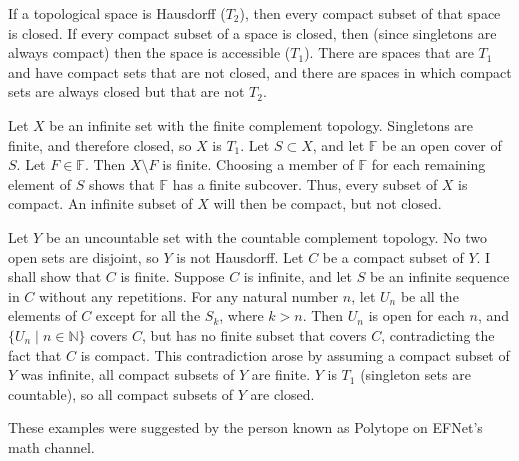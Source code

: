 \documentclass[12pt]{article}
\begin{document}
If a topological space is Hausdorff ($T_2$), then every compact subset of that space is closed.  If every compact subset of a space is closed, then (since singletons are always compact) then the space is accessible ($T_1$).  There are spaces that are $T_1$ and have compact sets that are not closed, and there are spaces in which compact sets are always closed but that are not $T_2$.

Let $X$ be an infinite set with the finite complement topology.  Singletons are finite, and therefore closed, so $X$ is $T_1$.  Let $S \subset X$, and let $\mathbb{F}$ be an open cover of $S$.  Let $F \in \mathbb{F}$.  Then $X\setminus F$ is finite.  Choosing a member of $\mathbb{F}$ for each remaining element of $S$ shows that $\mathbb{F}$ has a finite subcover.  Thus, every subset of $X$ is compact.  An infinite subset of $X$ will then be compact, but not closed.

Let $Y$ be an uncountable set with the countable complement topology.  No two open sets are disjoint, so $Y$ is not Hausdorff.  Let $C$ be a compact subset of $Y$.  I shall show that $C$ is finite.  Suppose $C$ is infinite, and let $S$ be an infinite sequence in $C$ without any repetitions.  For any natural number $n$, let $U_n$ be all the elements of $C$ except for all the $S_k$, where $k>n$.  Then $U_n$ is open for each $n$, and $\{U_n \mid n \in \mathbb{N}\}$ covers $C$, but has no finite subset that covers $C$, contradicting the fact that $C$ is compact.  This contradiction arose by assuming a compact subset of $Y$ was infinite, all compact subsets of $Y$ are finite.  $Y$ is $T_1$ (singleton sets are countable), so all compact subsets of $Y$ are closed.

These examples were suggested by the person known as Polytope on EFNet's math channel.
\end{document}
